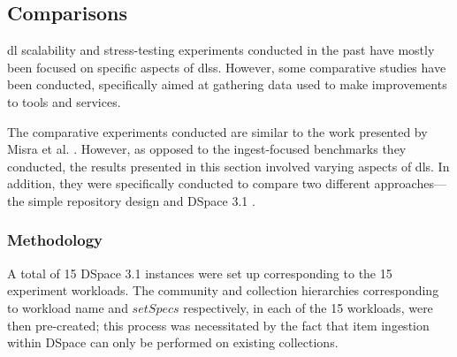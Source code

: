 \subsection{Comparisons}
\label{sec:evaluation:performance:performance-comparison}

\gls{dl} scalability \citep{Misra2008} and stress-testing \citep{Bainbridge2009} experiments conducted in the past have mostly been focused on specific aspects of \glspl{dls}. However, some comparative studies \citep{FIZ2012} have been conducted, specifically aimed at gathering data used to make improvements to tools and services.

The comparative experiments conducted are similar to the work presented by Misra et al. \citep{Misra2008}. However, as opposed to the ingest-focused benchmarks they conducted, the results presented in this section involved varying aspects of \glspl{dl}. In addition, they were specifically conducted to compare two different approaches---the simple repository design and DSpace 3.1 \citep{DSpace2013}.

\begin{comment}
\subsubsection{Experiment: DSpace performance comparisons}
\label{sec:evaluation:performance:comparison:experiment1}

This experiment was conducted to evaluate and compare performance results from potential non-indexed file-based repositories with DSpace-based repositories.
\end{comment}
\subsubsection{Methodology}
\label{sec:evaluation:performance:performance-comparison:methodology}

A total of \num{15} DSpace \num{3.1} instances were set up corresponding to the \num{15} experiment workloads. The community and collection hierarchies corresponding to workload name and $setSpecs$ respectively, in each of the \num{15} workloads, were then pre-created; this process was necessitated by the fact that item ingestion within DSpace can only be performed on existing collections.

